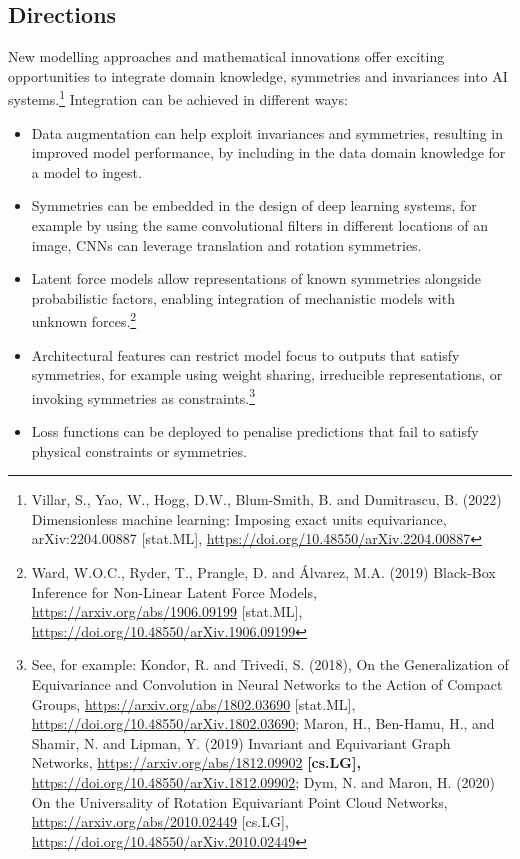 \subsection{Directions}\label{directions-2}

New modelling approaches and mathematical innovations offer exciting
opportunities to integrate domain knowledge, symmetries and invariances
into AI systems.\footnote{Villar, S., Yao, W., Hogg, D.W., Blum-Smith,
  B. and Dumitrascu, B. (2022) Dimensionless machine learning: Imposing
  exact units equivariance, arXiv:2204.00887 {[}stat.ML{]},
  \url{https://doi.org/10.48550/arXiv.2204.00887}}
Integration can be achieved in different ways:

\begin{itemize}
\item
  Data augmentation can help exploit invariances and symmetries,
  resulting in improved model performance, by including in the data
  domain knowledge for a model to ingest.
\item
  Symmetries can be embedded in the design of deep learning systems, for
  example by using the same convolutional filters in different locations
  of an image, CNNs can leverage translation and rotation symmetries.
\item
  Latent force models allow representations of known symmetries
  alongside probabilistic factors, enabling integration of mechanistic
  models with unknown forces.\footnote{Ward, W.O.C., Ryder, T., Prangle,
    D. and Álvarez, M.A. (2019) Black-Box Inference for Non-Linear
    Latent Force Models,
    \url{https://arxiv.org/abs/1906.09199}
    {[}stat.ML{]},
    \url{https://doi.org/10.48550/arXiv.1906.09199}}
\item
  Architectural features can restrict model focus to outputs that
  satisfy symmetries, for example using weight sharing, irreducible
  representations, or invoking symmetries as constraints.\footnote{See,
    for example: Kondor, R. and Trivedi, S. (2018), On the
    Generalization of Equivariance and Convolution in Neural Networks to
    the Action of Compact Groups,
    \url{https://arxiv.org/abs/1802.03690}
    {[}stat.ML{]},
    \url{https://doi.org/10.48550/arXiv.1802.03690};
    Maron, H., Ben-Hamu, H., and Shamir, N. and Lipman, Y. (2019)
    Invariant and Equivariant Graph Networks,
    \url{https://arxiv.org/abs/1812.09902}
    \textbf{{[}cs.LG{]},}
    \url{https://doi.org/10.48550/arXiv.1812.09902};
    Dym, N. and Maron, H. (2020) On the Universality of Rotation
    Equivariant Point Cloud Networks,
    \url{https://arxiv.org/abs/2010.02449}
    {[}cs.LG{]},
    \url{https://doi.org/10.48550/arXiv.2010.02449}}
\item
  Loss functions can be deployed to penalise predictions that fail to
  satisfy physical constraints or symmetries.
\end{itemize}

